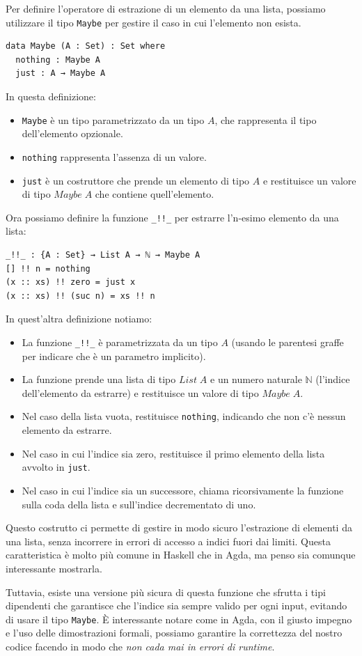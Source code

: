 \documentclass[a4paper]{article}
\theoremstyle{definition}
\theoremstyle{remark}
\begin{document}
Per definire l'operatore di estrazione di un elemento da una lista,
possiamo utilizzare il tipo \texttt{Maybe} per gestire il caso in cui l'elemento non esista.
\begin{verbatim}
data Maybe (A : Set) : Set where
  nothing : Maybe A
  just : A → Maybe A
\end{verbatim}
In questa definizione:
\begin{itemize}
  \item \texttt{Maybe} è un tipo parametrizzato da un tipo \( A \), che rappresenta il tipo dell'elemento opzionale.
  \item \texttt{nothing} rappresenta l'assenza di un valore.
  \item \texttt{just} è un costruttore che prende un elemento di tipo \( A \) e restituisce un valore di tipo \( Maybe \; A \) che contiene quell'elemento.
\end{itemize}
Ora possiamo definire la funzione \texttt{\_!!\_} per estrarre l'n-esimo elemento da una lista:
\begin{verbatim}
_!!_ : {A : Set} → List A → ℕ → Maybe A
[] !! n = nothing
(x :: xs) !! zero = just x
(x :: xs) !! (suc n) = xs !! n
\end{verbatim}
In quest'altra definizione notiamo:
\begin{itemize}
  \item La funzione \texttt{\_!!\_} è parametrizzata da un tipo \( A \) (usando le parentesi graffe per indicare che è un parametro implicito).
  \item La funzione prende una lista di tipo \( List \; A \) e un numero naturale \( ℕ \) (l'indice dell'elemento da estrarre) e restituisce un valore di tipo \( Maybe \; A \).
  \item Nel caso della lista vuota, restituisce \texttt{nothing}, indicando che non c'è nessun elemento da estrarre.
  \item Nel caso in cui l'indice sia zero, restituisce il primo elemento della lista avvolto in \texttt{just}.
  \item Nel caso in cui l'indice sia un successore, chiama ricorsivamente la funzione sulla coda della lista e sull'indice decrementato di uno.
\end{itemize}
Questo costrutto ci permette di gestire in modo sicuro l'estrazione di elementi da una lista,
senza incorrere in errori di accesso a indici fuori dai limiti. Questa caratteristica
è molto più comune in Haskell che in Agda, ma penso sia comunque interessante mostrarla.
\begin{Observation}{}{}
Tuttavia, esiste una versione più sicura di questa funzione che sfrutta i tipi dipendenti
che garantisce che l'indice sia sempre valido per ogni input, evitando di usare il tipo \texttt{Maybe}.
È interessante notare come in Agda, con il giusto impegno e l'uso delle dimostrazioni
formali, possiamo garantire la correttezza del nostro codice facendo in modo
che \textit{non cada mai in errori di runtime}. 
\end{Observation}
\end{document}
